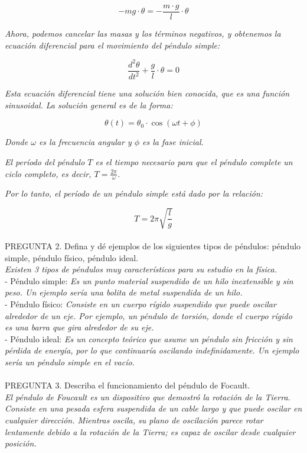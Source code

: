 \documentclass{article}
\begin{document}
$$ -mg \cdot \theta = -\frac{m \cdot g}{l} \cdot \theta $$

\textit{Ahora, podemos cancelar las masas y los términos negativos, y obtenemos la ecuación diferencial para el movimiento del péndulo simple:}

$$ \frac{d^2 \theta}{dt^2} + \frac{g}{l} \cdot \theta = 0 $$

\textit{Esta ecuación diferencial tiene una solución bien conocida, que es una función sinusoidal. La solución general es de la forma:}

$$ \theta(t) = \theta_0 \cdot \cos(\omega t + \phi) $$

\textit{Donde \( \omega \) es la frecuencia angular y \( \phi \) es la fase inicial.}

\textit{El período del péndulo \( T \) es el tiempo necesario para que el péndulo complete un ciclo completo, es decir, \( T = \frac{2\pi}{\omega} \).}

\textit{Por lo tanto, el período de un péndulo simple está dado por la relación:}

$$ T = 2\pi \sqrt{\frac{l}{g}} $$\\

PREGUNTA 2. Defina y dé ejemplos de los siguientes tipos de péndulos: péndulo simple, péndulo físico, péndulo ideal. \\
\textit{Existen 3 tipos de péndulos muy característicos para su estudio en la física.}\\
- Péndulo simple: \textit{Es un punto material suspendido de un hilo inextensible y sin peso. Un ejemplo sería una bolita de metal suspendida de un hilo.} \\
- Péndulo físico: \textit{Consiste en un cuerpo rígido suspendido que puede oscilar alrededor de un eje. Por ejemplo, un péndulo de torsión, donde el cuerpo rígido es una barra que gira alrededor de su eje.} \\
- Péndulo ideal: \textit{Es un concepto teórico que asume un péndulo sin fricción y sin pérdida de energía, por lo que continuaría oscilando indefinidamente. Un ejemplo sería un péndulo simple en el vacío.} \\\\

PREGUNTA 3. Describa el funcionamiento del péndulo de Focault. \\
\textit{El péndulo de Foucault es un dispositivo que demostró la rotación de la Tierra. Consiste en una pesada esfera suspendida de un cable largo y que puede oscilar en cualquier dirección. Mientras oscila, su plano de oscilación parece rotar lentamente debido a la rotación de la Tierra; es capaz de oscilar desde cualquier posición.} \\\\
\end{document}
